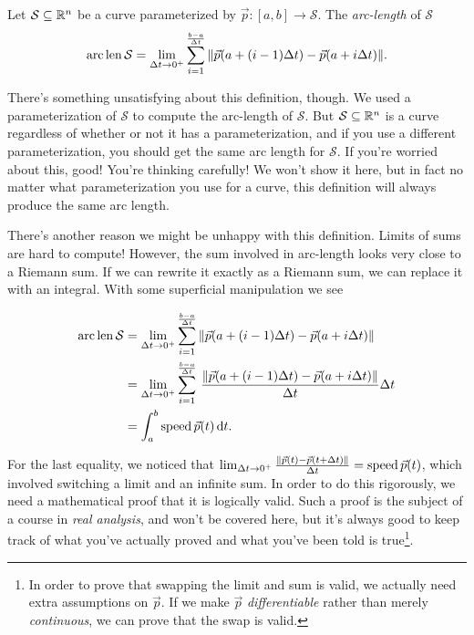 \begin{definition}
	Let $\mathcal S\subseteq \mathbb{R}^n$ be a curve parameterized by $\vec p:[a,b]\to\mathcal S$. 
	The \emph{arc-length}
	of $\mathcal S$ 
	\[
		\operatorname{arc\,len}\mathcal S = \lim_{\Delta t\to 0^+} \sum_{i=1}^{\frac{b-a}{\Delta t}} 
		\,\lVert\vec p(a+(i-1)\Delta t)-\vec p(a+i\Delta t)\rVert.
	\]
\end{definition}

There's something unsatisfying about this definition, though.  We used a parameterization
of $\mathcal S$ to compute the arc-length of $\mathcal S$.  But $\mathcal S\subseteq \mathbb{R}^n$ 
is a curve regardless of whether or not it has a parameterization, and if you use a different
parameterization, you should get the same arc length for $\mathcal S$.  If you're worried about
this, good!  You're thinking carefully!  We won't show it here, but in fact no matter what parameterization
you use for a curve, this definition will always produce the same arc length.

There's another reason we might be unhappy with this definition.  Limits of sums are
hard to compute!  However, the sum involved in arc-length looks very close to a Riemann sum.
If we can rewrite it exactly as a Riemann sum, we can replace it with an integral.  With some
superficial manipulation we see

\begin{align*}
	\operatorname{arc\,len}\mathcal S 
	&= \lim_{\Delta t\to 0^+} \sum_{i=1}^{\frac{b-a}{\Delta t}} 
	\,\lVert\vec p(a+(i-1)\Delta t)-\vec p(a+i\Delta t)\rVert\\
	&= \lim_{\Delta t\to 0^+} \sum_{i=1}^{\frac{b-a}{\Delta t}} 
	\,\frac{\lVert\vec p(a+(i-1)\Delta t)-\vec p(a+i\Delta t)\rVert}{\Delta t}\Delta t\\
	&=\int_{a}^b \operatorname{speed} \vec p(t)\,\mathrm{d} t.
\end{align*}

For the last equality, we noticed that 
$\lim_{\Delta t\to 0^+} \frac{\lVert\vec p(t)-\vec p(t+\Delta t)\rVert}{\Delta t}=\operatorname{speed} \vec p(t)$,
which involved switching a limit and an infinite sum.  In order to do this rigorously, we need
a mathematical proof that it is logically valid.  Such a proof is the subject of a course in
\emph{real analysis}, and won't be covered here, but it's always good to keep track of what
you've actually proved and what you've been told is true\footnote{ In order to prove that swapping
the limit and sum is valid, we actually need extra assumptions on $\vec p$.  If we make $\vec p$
\emph{differentiable} rather than merely \emph{continuous}, we can prove that the swap is valid.}.

